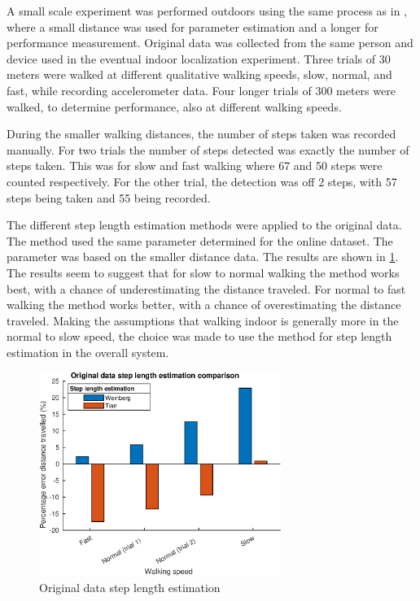 A small scale experiment was performed outdoors using the same process as in \cite{Vezocnik2019}, where a small distance was used for parameter estimation and a longer for performance measurement. Original data was collected from the same person and device used in the eventual indoor localization experiment. Three trials of 30 meters were walked at different qualitative walking speeds, slow, normal, and fast, while recording accelerometer data. Four longer trials of 300 meters were walked, to determine performance, also at different walking speeds. \par 
During the smaller walking distances, the number of steps taken was recorded manually. For two trials the number of steps detected was exactly the number of steps taken. This was for slow and fast walking where 67 and 50 steps were counted respectively.  For the other trial, the detection was off 2 steps, with 57 steps being taken and 55 being recorded. \par 
The different step length estimation methods were applied to the original data. The \citet{Tian2016} method used the same parameter determined for the online dataset. The \citet{Weinberg2002} parameter was based on the smaller distance data. The results are shown in \cref{fig:step_length_personal_testing}. The results seem to suggest that for slow to normal walking the \citet{Tian2016} method works best, with a chance of underestimating the distance traveled. For normal to fast walking the \citet{Weinberg2002} method works better, with a chance of overestimating the distance traveled. Making the assumptions that walking indoor is generally more in the normal to slow speed, the choice was made to use the \citet{Tian2016} method for step length estimation in the overall system.
\begin{figure}[H]
	\centering
	\includegraphics[width=0.7\textwidth]{images/20201113_1920_wienberg_vs_tian_og_data_1}
	\caption{Original data step length estimation \\ }
	\label{fig:step_length_personal_testing}
\end{figure}
\newpage
